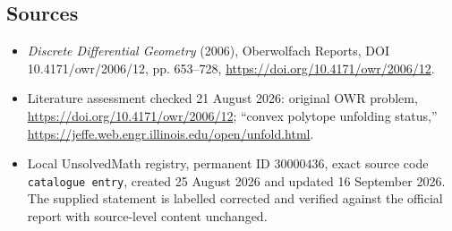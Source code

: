 \documentclass[11pt]{article}
\begin{document}
\subsection{Sources}
\begin{itemize}
\item \emph{Discrete Differential Geometry} (2006), Oberwolfach Reports, DOI 10.4171/owr/2006/12, pp. 653--728, \url{https://doi.org/10.4171/owr/2006/12}.
\item Literature assessment checked 21 August 2026: original OWR problem, \url{https://doi.org/10.4171/owr/2006/12}; ``convex polytope unfolding status,'' \url{https://jeffe.web.engr.illinois.edu/open/unfold.html}.
\item Local UnsolvedMath registry, permanent ID $30000436$, exact source code \texttt{catalogue entry}, created 25 August 2026 and updated 16 September 2026. The supplied statement is labelled corrected and verified against the official report with source-level content unchanged.
\end{itemize}
\end{document}
